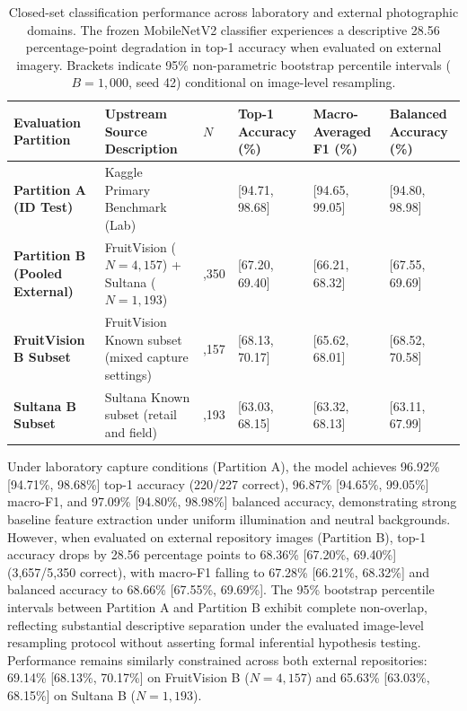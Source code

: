\begin{table}[!t]
\caption{Closed-set classification performance across laboratory and external photographic domains. The frozen MobileNetV2 classifier experiences a descriptive 28.56 percentage-point degradation in top-1 accuracy when evaluated on external imagery. Brackets indicate 95\% non-parametric bootstrap percentile intervals ($B = 1,000$, seed 42) conditional on image-level resampling.}
\label{tab:closed_set_comparison}
\centering
\footnotesize
\setlength{\tabcolsep}{2.5pt}
\begin{tabular}{>{\raggedright\arraybackslash}p{3.0cm} >{\raggedright\arraybackslash}p{3.8cm} >{\centering\arraybackslash}p{1.0cm} >{\centering\arraybackslash}p{2.2cm} >{\centering\arraybackslash}p{2.2cm} >{\centering\arraybackslash}p{2.2cm}}
\toprule
\textbf{Evaluation Partition} & \textbf{Upstream Source Description} & \textbf{$N$} & \textbf{Top-1 Accuracy (\%)} & \textbf{Macro-Averaged F1 (\%)} & \textbf{Balanced Accuracy (\%)} \\
\midrule
\textbf{Partition A (ID Test)} & Kaggle Primary Benchmark (Lab) & 227 & 96.92 [94.71, 98.68] & 96.87 [94.65, 99.05] & 97.09 [94.80, 98.98] \\
\addlinespace[3pt]
\textbf{Partition B (Pooled External)} & FruitVision ($N=4,157$) + Sultana ($N=1,193$) & 5,350 & 68.36 [67.20, 69.40] & 67.28 [66.21, 68.32] & 68.66 [67.55, 69.69] \\
\addlinespace[3pt]
\textbf{FruitVision B Subset} & FruitVision Known subset (mixed capture settings) & 4,157 & 69.14 [68.13, 70.17] & 66.75 [65.62, 68.01] & 69.56 [68.52, 70.58] \\
\addlinespace[3pt]
\textbf{Sultana B Subset} & Sultana Known subset (retail and field) & 1,193 & 65.63 [63.03, 68.15] & 65.77 [63.32, 68.13] & 65.55 [63.11, 67.99] \\
\bottomrule
\end{tabular}
\end{table}

Under laboratory capture conditions (Partition A), the model achieves 96.92\% [94.71\%, 98.68\%] top-1 accuracy (220/227 correct), 96.87\% [94.65\%, 99.05\%] macro-F1, and 97.09\% [94.80\%, 98.98\%] balanced accuracy, demonstrating strong baseline feature extraction under uniform illumination and neutral backgrounds. However, when evaluated on external repository images (Partition B), top-1 accuracy drops by 28.56 percentage points to 68.36\% [67.20\%, 69.40\%] (3,657/5,350 correct), with macro-F1 falling to 67.28\% [66.21\%, 68.32\%] and balanced accuracy to 68.66\% [67.55\%, 69.69\%]. The 95\% bootstrap percentile intervals between Partition A and Partition B exhibit complete non-overlap, reflecting substantial descriptive separation under the evaluated image-level resampling protocol without asserting formal inferential hypothesis testing. Performance remains similarly constrained across both external repositories: 69.14\% [68.13\%, 70.17\%] on FruitVision B ($N = 4,157$) and 65.63\% [63.03\%, 68.15\%] on Sultana B ($N = 1,193$).

